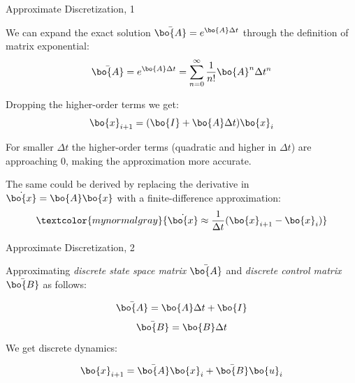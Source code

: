\documentclass{beamer}
\begin{document}
\begin{frame}{Approximate Discretization, 1}
\begin{flushleft}

We can expand the exact solution $\bar{\bo{A}} = e^{\bo{A}\Delta t}$ through the definition of matrix exponential:
%
\begin{equation}
	\bar{\bo{A}} = e^{\bo{A}\Delta t} =  \sum_{n=0}^{\infty} \frac{1}{n!} \bo{A}^n \Delta t^n
\end{equation}

Dropping the higher-order terms we get:
%
\begin{equation}
\bo{x}_{i + 1} = ( \bo{I} + \bo{A} \Delta t) \bo{x}_i
\end{equation}

For smaller $\Delta t$ the higher-order terms (quadratic and higher in $\Delta t$) are approaching 0, making the approximation more accurate. 

\bigskip

\textcolor{mynormalgray}
{
	The same could be derived by replacing the derivative in $\dot{\bo{x}} = \bo{A}  \bo{x}$ with a finite-difference approximation:}
%
\begin{equation*}
	\textcolor{mynormalgray}
	{\dot {\bo{x}} \approx \frac{1}{\Delta t}(\bo{x}_{i+1} - \bo{x}_i)}
\end{equation*}

\end{flushleft}
\end{frame}




\begin{frame}{Approximate Discretization, 2}
\begin{flushleft}

Approximating \emph{discrete state space matrix} $\bar{\bo{A}}$ and \emph{discrete control matrix} $\bar{\bo{B}}$ as follows:

\begin{equation}
\bar{\bo{A}} = \bo{A} \Delta t + \bo{I}
\end{equation}
\begin{equation}
\bar{\bo{B}} = \bo{B} \Delta t
\end{equation}
%
We get discrete dynamics:

\begin{equation}
\bo{x}_{i+1} = \bar{\bo{A}} \bo{x}_i + \bar{\bo{B}} \bo{u}_i
\end{equation}

\end{flushleft}
\end{frame}
\end{document}
